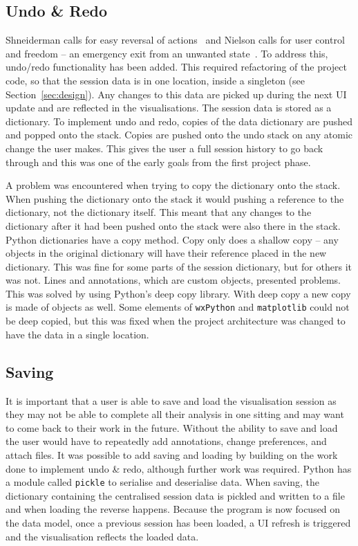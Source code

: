 \subsection{Undo \& Redo}
\label{sec:undo}
Shneiderman calls for easy reversal of actions~\cite{shgold} and Nielson calls for user control and freedom -- an emergency exit from an unwanted state~\cite{neilten}.  To address this, undo/redo functionality has been added.  This required refactoring of the project code, so that the session data is in one location, inside a singleton (see Section~\ref{sec:design}). Any changes to this data are picked up during the next \ac{UI} update and are reflected in the visualisations.  The session data is stored as a dictionary.  To implement undo and redo, copies of the data dictionary are pushed and popped onto the stack.  Copies are pushed onto the undo stack on any atomic change the user makes.  This gives the user a full session history to go back through and this was one of the early goals from the first project phase.

A problem was encountered when trying to copy the dictionary onto the stack.  When pushing the dictionary onto the stack it would pushing a reference to the dictionary, not the dictionary itself. This meant that any changes to the dictionary after it had been pushed onto the stack were also there in the stack.  Python dictionaries have a copy method.  Copy only does a shallow copy -- any objects in the original dictionary will have their reference placed in the new dictionary.  This was fine for some parts of the session dictionary, but for others it was not. Lines and annotations, which are custom objects, presented problems.  This was solved by using Python's deep copy library.  With deep copy a new copy is made of objects as well.  Some elements of \texttt{wxPython} and \texttt{matplotlib} could not be deep copied, but this was fixed when the project architecture was changed to have the data in a single location.

\subsection{Saving}

It is important that a user is able to save and load the visualisation session as they may not be able to complete all their analysis in one sitting and may want to come back to their work in the future.  Without the ability to save and load the user would have to repeatedly add annotations, change preferences, and attach files.  It was possible to add saving and loading by building on the work done to implement undo \& redo, although further work was required. Python has a module called \texttt{pickle} to serialise and deserialise data.  When saving, the dictionary containing the centralised session data is pickled and written to a file and when loading the reverse happens.  Because the program is now focused on the data model, once a previous session has been loaded, a \ac{UI} refresh is triggered and the visualisation reflects the loaded data.

